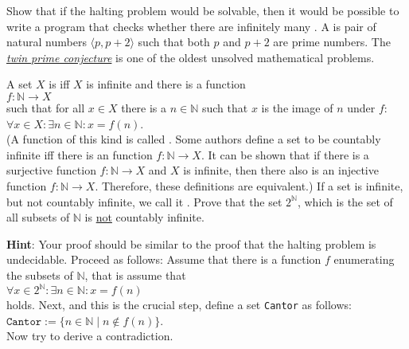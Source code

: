\exerciseEng
Show that if the halting problem would be solvable, then it would be possible to write a program that checks
whether there are infinitely many .  
A  is pair of natural numbers
$\langle p, p + 2 \rangle$ such that both $p$ and $p+2$ are prime numbers.  
The \href{http://en.wikipedia.org/wiki/Twin_prime_conjecture}{\emph{twin prime conjecture}} is one
of the oldest unsolved mathematical problems.  \eox

\exerciseEng
A set $X$ is  iff $X$ is infinite and there is a function 
\\[0.2cm]
\hspace*{1.3cm}
 $f: \mathbb{N} \rightarrow X$ 
\\[0.2cm]
such that for all $x\in X$ there is a $n \in \mathbb{N}$ such that $x$ is the image of
$n$ under $f$: 
\\[0.2cm]
\hspace*{1.3cm} $\forall x \in X: \exists n \in \mathbb{N}: x = f(n)$.
\\[0.2cm]
(A function of this kind is called . 
Some authors define a set to be countably infinite iff
there is an   function $f:\mathbb{N} \rightarrow X$.  It can be shown that if there is a
surjective function $f:\mathbb{N} \rightarrow X$ and $X$ is infinite, then there also is an injective function
$f:\mathbb{N} \rightarrow X$.  Therefore, these definitions are equivalent.) 
If a set is infinite, but not countably infinite, we call it .
Prove that the set $2^\mathbb{N}$, which is the set of all subsets of $\mathbb{N}$ is \underline{not} countably
infinite. 

\vspace*{0.2cm}

\noindent
\textbf{Hint}:  Your proof should be similar to the proof that the halting problem is undecidable. 
Proceed as follows:
Assume that there is a function $f$ enumerating the subsets of $\mathbb{N}$, that is assume that 
\\[0.2cm]
\hspace*{1.3cm}
$\forall x \in 2^\mathbb{N}: \exists n \in \mathbb{N}: x = f(n)$
\\[0.2cm]
holds.  Next, and this is the crucial step, define a set \texttt{Cantor} as follows:
\\[0.2cm]
\hspace*{1.3cm} $\mathtt{Cantor} := \bigl\{ n \in \mathbb{N} \mid n \notin f(n) \bigr\}$.
\\[0.2cm]
Now try to derive a contradiction.  \eox



